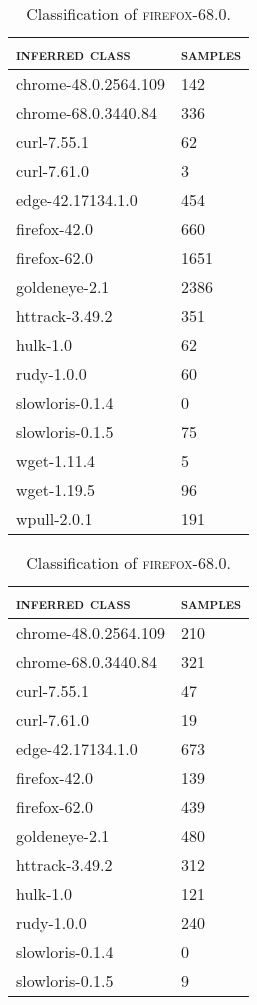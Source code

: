 \begin{table}[H]
	\centering
	\begin{subtable}{.45\linewidth}
		\centering
	\begin{tabular}{ll}
		\toprule
		\textsc{inferred class} & \textsc{samples}\\
		\midrule
		chrome-48.0.2564.109 & 142\\
		chrome-68.0.3440.84 & 336\\
		curl-7.55.1 & 62\\
		curl-7.61.0 & 3\\
		edge-42.17134.1.0 & 454\\
		firefox-42.0 & 660\\
		firefox-62.0 & 1651\\
		goldeneye-2.1 & 2386\\
		httrack-3.49.2 & 351\\
		hulk-1.0 & 62\\
		rudy-1.0.0 & 60\\
		slowloris-0.1.4 & 0\\
		slowloris-0.1.5 & 75\\
		wget-1.11.4 & 5\\
		wget-1.19.5 & 96\\
		wpull-2.0.1 & 191\\
		\bottomrule
	\end{tabular}
	\caption{Classification of \textsc{firefox-68.0}.}
	\end{subtable}
	\begin{subtable}{.45\linewidth}
		\centering
	\begin{tabular}{ll}
		\toprule
		\textsc{inferred class} & \textsc{samples}\\
		\midrule
		chrome-48.0.2564.109 & 210\\
		chrome-68.0.3440.84 & 321\\
		curl-7.55.1 & 47\\
		curl-7.61.0 & 19\\
		edge-42.17134.1.0 & 673\\
		firefox-42.0 & 139\\
		firefox-62.0 & 439\\
		goldeneye-2.1 & 480\\
		httrack-3.49.2 & 312\\
		hulk-1.0 & 121\\
		rudy-1.0.0 & 240\\
		slowloris-0.1.4 & 0\\
		slowloris-0.1.5 & 9\\

\end{tabular}
\end{subtable}
\end{table}
